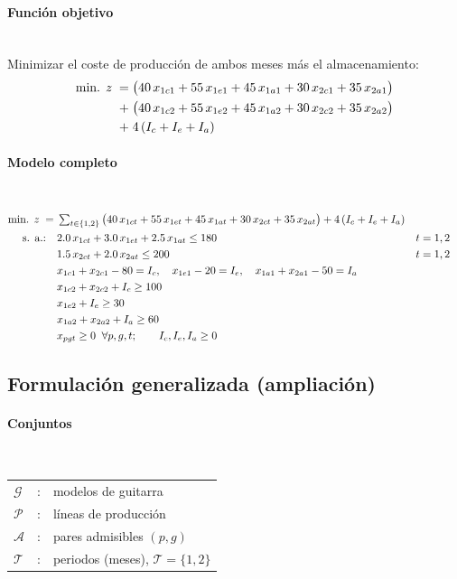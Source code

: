 \paragraph{Función objetivo}\mbox{}\\
Minimizar el coste de producción de ambos meses más el almacenamiento:
\begin{align}
\mbox{min. } z \;=\;
& \big(40\,x_{1c1} + 55\,x_{1e1} + 45\,x_{1a1} + 30\,x_{2c1} + 35\,x_{2a1}\big) \notag\\
+\;& \big(40\,x_{1c2} + 55\,x_{1e2} + 45\,x_{1a2} + 30\,x_{2c2} + 35\,x_{2a2}\big) \notag\\
+\;& 4\,(I_c + I_e + I_a)
\end{align}

\paragraph{Modelo completo}\mbox{}\\
\begin{align}
\mbox{min. } z \;=\;
& \textstyle\sum_{t\in\{1,2\}} \big(40\,x_{1ct} + 55\,x_{1et} + 45\,x_{1at} + 30\,x_{2ct} + 35\,x_{2at}\big) + 4\,(I_c + I_e + I_a) \notag\\
\mbox{s. a.:}\quad
& 2.0\,x_{1ct} + 3.0\,x_{1et} + 2.5\,x_{1at} \leq 180 && t=1,2 \notag\\
& 1.5\,x_{2ct} + 2.0\,x_{2at} \leq 200 && t=1,2 \notag\\
& x_{1c1} + x_{2c1} - 80 = I_c,\quad x_{1e1} - 20 = I_e,\quad x_{1a1} + x_{2a1} - 50 = I_a \notag\\
& x_{1c2} + x_{2c2} + I_c \geq 100 \notag\\
& x_{1e2} + I_e \geq 30 \notag\\
& x_{1a2} + x_{2a2} + I_a \geq 60 \notag\\
& x_{pgt} \geq 0 \;\; \forall p,g,t; \qquad I_c, I_e, I_a \geq 0 \notag
\end{align}

\subsection{Formulación generalizada (ampliación)}

\paragraph{Conjuntos}\mbox{}\\
\begin{tabular}{l c l}
    $\mathcal{G}$  & : & modelos de guitarra \\
    $\mathcal{P}$  & : & líneas de producción \\
    $\mathcal{A}$  & : & pares admisibles $(p,g)$ \\
    $\mathcal{T}$  & : & periodos (meses), $\mathcal{T}=\{1,2\}$ \\
\end{tabular}

